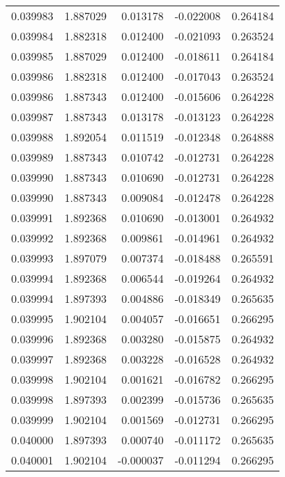 \begin{tabular}{lrrrr}
0.039983    &  1.887029 &  0.013178 & -0.022008 &             0.264184 \\
0.039984    &  1.882318 &  0.012400 & -0.021093 &             0.263524 \\
0.039985    &  1.887029 &  0.012400 & -0.018611 &             0.264184 \\
0.039986    &  1.882318 &  0.012400 & -0.017043 &             0.263524 \\
0.039986    &  1.887343 &  0.012400 & -0.015606 &             0.264228 \\
0.039987    &  1.887343 &  0.013178 & -0.013123 &             0.264228 \\
0.039988    &  1.892054 &  0.011519 & -0.012348 &             0.264888 \\
0.039989    &  1.887343 &  0.010742 & -0.012731 &             0.264228 \\
0.039990    &  1.887343 &  0.010690 & -0.012731 &             0.264228 \\
0.039990    &  1.887343 &  0.009084 & -0.012478 &             0.264228 \\
0.039991    &  1.892368 &  0.010690 & -0.013001 &             0.264932 \\
0.039992    &  1.892368 &  0.009861 & -0.014961 &             0.264932 \\
0.039993    &  1.897079 &  0.007374 & -0.018488 &             0.265591 \\
0.039994    &  1.892368 &  0.006544 & -0.019264 &             0.264932 \\
0.039994    &  1.897393 &  0.004886 & -0.018349 &             0.265635 \\
0.039995    &  1.902104 &  0.004057 & -0.016651 &             0.266295 \\
0.039996    &  1.892368 &  0.003280 & -0.015875 &             0.264932 \\
0.039997    &  1.892368 &  0.003228 & -0.016528 &             0.264932 \\
0.039998    &  1.902104 &  0.001621 & -0.016782 &             0.266295 \\
0.039998    &  1.897393 &  0.002399 & -0.015736 &             0.265635 \\
0.039999    &  1.902104 &  0.001569 & -0.012731 &             0.266295 \\
0.040000    &  1.897393 &  0.000740 & -0.011172 &             0.265635 \\
0.040001    &  1.902104 & -0.000037 & -0.011294 &             0.266295 \\

\end{tabular}

